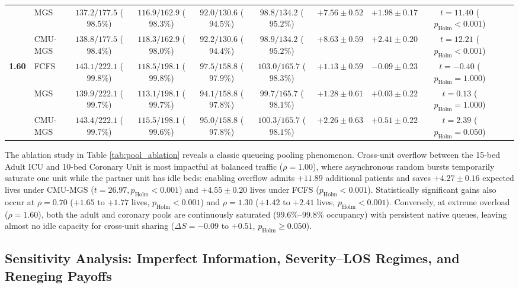 \documentclass[final,5p,times,twocolumn]{elsarticle}
\begin{document}
\begin{table}[t]
{\begin{tabular}{clccccccccc}
 & MGS     & $137.2 / 177.5$ ($98.5\%$) & $116.9 / 162.9$ ($98.3\%$) & $92.0 / 130.6$ ($94.5\%$) & $98.8 / 134.2$ ($95.2\%$) & $+7.56 \pm 0.52$ & $+1.98 \pm 0.17$ & $t = 11.40$ ($p_{\text{Holm}} < 0.001$) \\
 & CMU-MGS & $138.8 / 177.5$ ($98.4\%$) & $118.3 / 162.9$ ($98.0\%$) & $92.2 / 130.6$ ($94.4\%$) & $98.9 / 134.2$ ($95.2\%$) & $+8.63 \pm 0.59$ & $+2.41 \pm 0.20$ & $t = 12.21$ ($p_{\text{Holm}} < 0.001$) \\
\midrule
\multirow{3}{*}{\textbf{1.60}}
 & FCFS    & $143.1 / 222.1$ ($99.8\%$) & $118.5 / 198.1$ ($99.8\%$) & $97.5 / 158.8$ ($97.9\%$) & $103.0 / 165.7$ ($98.3\%$) & $+1.13 \pm 0.59$ & $-0.09 \pm 0.23$ & $t = -0.40$ ($p_{\text{Holm}} = 1.000$) \\
 & MGS     & $139.9 / 222.1$ ($99.7\%$) & $113.1 / 198.1$ ($99.7\%$) & $94.1 / 158.8$ ($97.8\%$) & $99.7 / 165.7$ ($98.1\%$) & $+1.28 \pm 0.61$ & $+0.03 \pm 0.22$ & $t = 0.13$ ($p_{\text{Holm}} = 1.000$) \\
 & CMU-MGS & $143.4 / 222.1$ ($99.7\%$) & $115.5 / 198.1$ ($99.6\%$) & $95.0 / 158.8$ ($97.8\%$) & $100.3 / 165.7$ ($98.1\%$) & $+2.26 \pm 0.63$ & $+0.51 \pm 0.22$ & $t = 2.39$ ($p_{\text{Holm}} = 0.050$) \\
\bottomrule
\end{tabular}
}
\end{table}

The ablation study in Table \ref{tab:pool_ablation} reveals a classic queueing pooling phenomenon. Cross-unit overflow between the 15-bed Adult ICU and 10-bed Coronary Unit is most impactful at balanced traffic ($\rho = 1.00$), where asynchronous random bursts temporarily saturate one unit while the partner unit has idle beds: enabling overflow admits $+11.89$ additional patients and saves $+4.27 \pm 0.16$ expected lives under CMU-MGS ($t = 26.97, p_{\text{Holm}} < 0.001$) and $+4.55 \pm 0.20$ lives under FCFS ($p_{\text{Holm}} < 0.001$). Statistically significant gains also occur at $\rho = 0.70$ ($+1.65$ to $+1.77$ lives, $p_{\text{Holm}} < 0.001$) and $\rho = 1.30$ ($+1.42$ to $+2.41$ lives, $p_{\text{Holm}} < 0.001$). Conversely, at extreme overload ($\rho = 1.60$), both the adult and coronary pools are continuously saturated ($99.6\%$--$99.8\%$ occupancy) with persistent native queues, leaving almost no idle capacity for cross-unit sharing ($\Delta S = -0.09$ to $+0.51$, $p_{\text{Holm}} \ge 0.050$).

\subsection{Sensitivity Analysis: Imperfect Information, Severity--LOS Regimes, and Reneging Payoffs}
\end{document}
